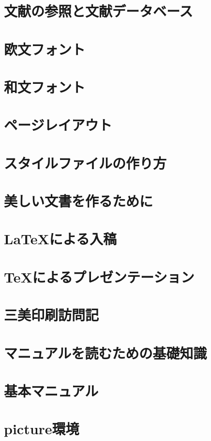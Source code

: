 \documentclass{jsbook}
\begin{document}
\chapter{文献の参照と文献データベース}

\chapter{欧文フォント}

\chapter{和文フォント}

\chapter{ページレイアウト}

\chapter{スタイルファイルの作り方}

\chapter{美しい文書を作るために}

\chapter{\LaTeX による入稿}

\chapter{TeXによるプレゼンテーション}

\appendix

\chapter{三美印刷訪問記}

\chapter{マニュアルを読むための基礎知識}

\chapter{基本マニュアル}

\chapter{picture環境}
\end{document}
